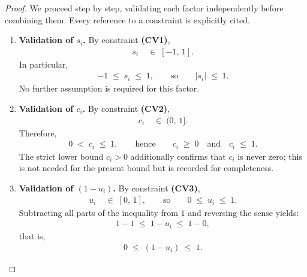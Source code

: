 \documentclass[12pt,openany]{book}
\numberwithin{equation}{chapter}
\theoremstyle{plain}
\theoremstyle{definition}
\theoremstyle{remark}
\numberwithin{equation}{chapter}
\theoremstyle{plain}
\begin{document}
\begin{proof}
We proceed step by step, validating each factor independently before
combining them.  Every reference to a constraint is explicitly cited.

\begin{enumerate}

  \item \textbf{Validation of $s_i$.}
        By constraint \textbf{(CV1)},
        \begin{align}
          s_i &\;\in\; [-1,\,1].
        \end{align}
        In particular,
        \begin{align}
          -1 \;\leq\; s_i \;\leq\; 1,
          \qquad\text{so}\qquad
          |s_i| \;\leq\; 1.
          \label{eq:cv1-bound}
        \end{align}
        No further assumption is required for this factor.

  \item \textbf{Validation of $c_i$.}
        By constraint \textbf{(CV2)},
        \begin{align}
          c_i &\;\in\; (0,\,1].
        \end{align}
        Therefore,
        \begin{align}
          0 \;<\; c_i \;\leq\; 1,
          \qquad\text{hence}\qquad
          c_i \;\geq\; 0
          \quad\text{and}\quad
          c_i \;\leq\; 1.
          \label{eq:cv2-bound}
        \end{align}
        The strict lower bound $c_i > 0$ additionally confirms that
        $c_i$ is never zero; this is not needed for the present bound
        but is recorded for completeness.

  \item \textbf{Validation of $(1 - u_i)$.}
        By constraint \textbf{(CV3)},
        \begin{align}
          u_i &\;\in\; [0,\,1],
          \qquad\text{so}\qquad
          0 \;\leq\; u_i \;\leq\; 1.
        \end{align}
        Subtracting all parts of the inequality from $1$ and reversing
        the sense yields:
        \begin{align}
          1 - 1 \;\leq\; 1 - u_i \;\leq\; 1 - 0,
        \end{align}
        that is,
        \begin{align}
          0 \;\leq\; (1 - u_i) \;\leq\; 1.
          \label{eq:cv3-bound}
        \end{align}


\end{enumerate}
\end{proof}
\end{document}
